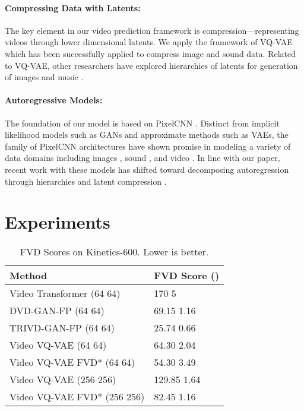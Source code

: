 \documentclass{article}
\begin{document}
\paragraph{Compressing Data with Latents:}
The key element in our video prediction framework is compression---representing videos through lower dimensional latents. We apply the framework of VQ-VAE \cite{OordVK17, RazaviOV19} which has been successfully applied to compress image and sound data.
Related to VQ-VAE, other researchers have explored hierarchies of latents for generation of images \cite{defauw19} and music \cite{DielemanOS18}.

\paragraph{Autoregressive Models:}
The foundation of our model is based on PixelCNN \cite{OordKK16}. Distinct from implicit likelihood models such as GANs and approximate methods such as VAEs, the family of PixelCNN architectures have shown promise in modeling a variety of data domains including images \cite{OordKK16}, sound \cite{oord2016wavenet}, and video \cite{KalchbrennerOSD17, WeissenbornTU20}. In line with our paper, recent work with these models has shifted toward decomposing autoregression through hierarchies \cite{MenickK19, ReedOKCWCBF17} and latent compression \cite{OordVK17, RazaviOV19, jukebox}.
 \section{Experiments}

\begin{table}
  \caption{FVD Scores on Kinetics-600. Lower is better.}
  \centering
  \begin{tabular}{ll}
    \toprule
    Method     & FVD Score () \\
    \midrule
    Video Transformer (64  64) \cite{WeissenbornTU20} & 170  5	    \\
    DVD-GAN-FP (64  64) \cite{clark2020adversarial}   & 69.15  1.16 \\
    TRIVD-GAN-FP (64  64) \cite{luc2020} & 25.74  0.66  \\
    \midrule
    Video VQ-VAE (64  64) & 64.30  2.04  \\
    Video VQ-VAE FVD* (64  64) & 54.30  3.49  \\
    Video VQ-VAE (256  256) & 129.85  1.64  \\
    Video VQ-VAE FVD* (256  256) & 82.45   1.16  \\
    \bottomrule
  \end{tabular}
  \label{quant_results}
\end{table}
\end{document}
